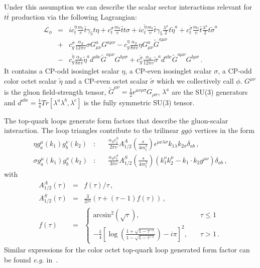 \documentclass[aps,prd,amsmath,amssymb,superscriptaddress, preprintnumbers,preprint,nofootinbib,a4paper]{revtex4}
\begin{document}
Under this assumption we can describe the scalar sector interactions relevant for $t\bar{t}$ production via the following Lagrangian:
\begin{eqnarray}
\mathcal{L}_\phi &=&  i c^\eta_t\frac{m_t}{v} \bar{t}\gamma_5 t \eta +  c^\sigma_t \frac{m_t}{v} \bar{t} t \sigma 
             + i c^{\tilde{\eta}}_t\frac{m_t}{v} \bar{t}\gamma_5 \frac{\lambda^a}{2} t \tilde{\eta}^a 
  + c^{\tilde{\sigma}}_t\frac{m_t}{v} \bar{t} \frac{\lambda^a}{2} t {\tilde{\sigma}}^a \nonumber \\
       &+& c_g^\sigma \frac{\alpha_S}{12\pi v}\sigma G^a_{\mu\nu}G^{a\mu\nu} 
        - c_g^\eta \frac{\alpha_S}{8\pi v}\eta G^a_{\mu\nu}\widetilde{G}^{a\mu\nu} \nonumber \\
        &-& c_g^{\tilde{\eta}} \frac{\alpha_S}{8\pi v} \tilde{\eta}^a d^{abc} \widetilde{G}^{a\mu\nu} G^{b\rho\sigma} 
        + c_g^{\tilde{\sigma}} \frac{\alpha_S}{12\pi v}{\tilde{\sigma}}^a d^{abc} \widetilde{G}^{a\mu\nu} G^{b\rho\sigma} \,.        
\label{eq:ygg}
\end{eqnarray}
It contains a CP-odd isosinglet scalar $\eta$, a CP-even isosinglet scalar $\sigma$, a  CP-odd color octet scalar $\tilde{\eta}$ and a CP-even octet scalar $\tilde{\sigma}$ which we collectively call $\phi$.
 $G^{\mu\nu}$ is the gluon field-strength tensor, $\widetilde{G}^{\mu\nu}=\frac{1}{2}\epsilon^{\mu\nu\rho\sigma}G_{\rho\sigma}$, $\lambda^a$ are the SU(3) generators and $d^{abc}=\frac{1}{4}Tr[\lambda^a{\lambda^b,\lambda^c}]$ is the fully symmetric SU(3) tensor.


The top-quark loops generate form factors that describe the gluon-scalar interaction.
The loop triangles contribute to the trilinear $gg\phi$ vertices in the form
 \begin{eqnarray}
\eta g_a^\mu(k_1) g_b^\nu(k_2) &:&\quad \frac{\alpha_S c_t^\eta}{2\pi v} A^{A}_{1/2}\left(\frac{s}{4m_t^2}\right) 
   \epsilon^{\mu\nu\lambda\sigma}k_{1\lambda} k_{2\sigma}\delta_{ab} \,,\\
\sigma g_a^\mu(k_1) g_b^\nu(k_2) &:&\quad \frac{\alpha_S c_t^\sigma}{3\pi v} A^{S}_{1/2}\left(\frac{s}{4m_t^2}\right) 
 (k_1^\nu k_2^\mu-k_1\cdot k_2 g^{\mu\nu})\delta_{ab} \,,\label{eq:formfactors}
\end{eqnarray}
with
\begin{eqnarray}
A^{A}_{1/2}(\tau)&=&f(\tau)/\tau \,, \label{eq:AA}\\
A^{S}_{1/2}(\tau)&=&\frac{3}{2\tau^2}\left(\tau+(\tau-1)f(\tau)\right) \,, \label{eq:AS}\\
f(\tau) &=& 
    \begin{cases}
      \text{arcsin}^2(\sqrt{\tau}), & \quad \tau\leq 1 \\
      -\frac{1}{4}\left[\log\left(\frac{1+\sqrt{1-\tau^{-1}}}{1-\sqrt{1-\tau^{-1}}} \right)-i\pi \right]^2, & \quad \tau>1\,.
    \end{cases}
\label{eq:ftau}
\end{eqnarray}  
Similar expressions for the color octet top-quark loop generated form factor can be found \emph{e.g.} in~\cite{Hayreter:2017wra}. 
\end{document}

